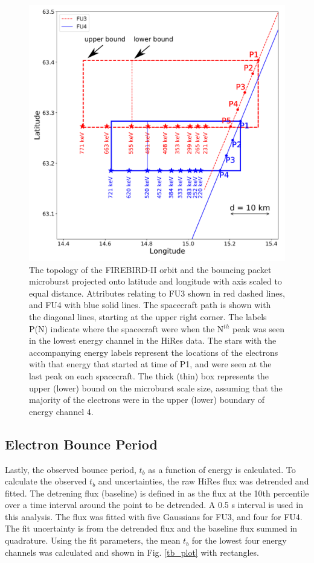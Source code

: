 \documentclass[draft,linenumbers]{agujournal}
\begin{document}
\begin{figure}
\includegraphics[width=\textwidth]{decay_microburst_distance_corrected_CH4_last_pk_drift_color.pdf}
\caption{The topology of the FIREBIRD-II orbit and the bouncing packet microburst projected onto latitude and longitude with axis scaled to equal distance. Attributes relating to FU3 shown in red dashed lines, and FU4 with blue solid lines. The spacecraft path is shown with the diagonal lines, starting at the upper right corner. The labels P(N) indicate where the spacecraft were when the N$^{th}$ peak was seen in the lowest energy channel in the HiRes data. The stars with the accompanying energy labels represent the locations of the electrons with that energy that started at time of P1, and were seen at the last peak on each spacecraft. The thick (thin) box represents the upper (lower) bound on the microburst scale size, assuming that the majority of the electrons were in the upper (lower) boundary of energy channel 4.}
\label{map_plot}
\end{figure}

\subsection{Electron Bounce Period} \label{t_b} %
Lastly, the observed bounce period, $t_b$ as a function of energy is calculated. To calculate the observed $t_b$ and uncertainties, the raw HiRes flux was detrended and fitted. The detrening flux (baseline) is defined in \citet{O'Brien04} as the flux at the 10th percentile over a time interval around the point to be detrended. A 0.5 s interval is used in this analysis. The flux was fitted with five Gaussians for FU3, and four for FU4. The fit uncertainty is from the detrended flux and the baseline flux summed in quadrature. Using the fit parameters, the mean $t_b$ for the lowest four energy channels was calculated and shown in Fig. \ref{tb_plot} with rectangles. 
\end{document}
